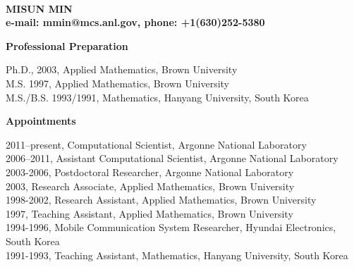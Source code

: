 \documentclass[11pt,letterpaper,english]{article}
\begin{document}
\setlength{\parindent}{0in} %

\pagestyle{fancy}   \renewcommand{%
\headrulewidth}{0.0pt}

\\
{\bf MISUN MIN}\\
{\bf e-mail: mmin@mcs.anl.gov, phone: +1(630)252-5380} \smallskip

\begin{flushleft} {\bf Professional Preparation}
{\parindent 16pt

Ph.D., 2003, Applied Mathematics, Brown University \\
M.S. 1997, Applied Mathematics, Brown University \\
M.S./B.S. 1993/1991, Mathematics, Hanyang University, South Korea \\
}

\vspace{.04in}
{\bf Appointments}
{\parindent 16pt

2011--present, Computational Scientist, Argonne National Laboratory \\
2006--2011, Assistant Computational Scientist, Argonne National Laboratory\\
2003-2006, Postdoctoral Researcher, Argonne National Laboratory\\
2003, Research Associate, Applied Mathematics, Brown University \\
1998-2002, Research Assistant, Applied Mathematics, Brown University \\
1997, Teaching Assistant, Applied Mathematics, Brown University\\
1994-1996, Mobile Communication System Researcher, Hyundai Electronics, South Korea\\
1991-1993, Teaching Assistant, Mathematics, Hanyang University, South Korea \\
}


\end{flushleft}
\end{document}

